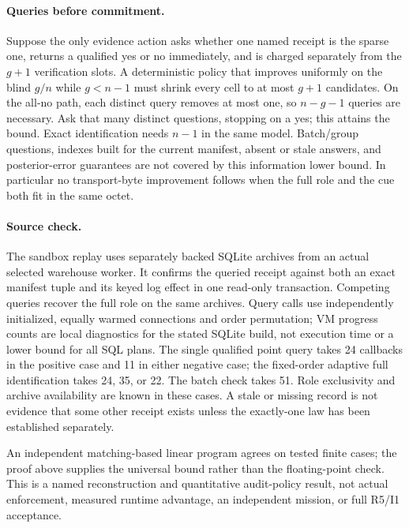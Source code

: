 \documentclass{article}
\begin{document}
\paragraph{Queries before commitment.}
Suppose the only evidence action asks whether one named receipt is
the sparse one, returns a qualified yes or no immediately, and is
charged separately from the $g+1$ verification slots. A deterministic
policy that improves uniformly on the blind $g/n$ while $g<n-1$
must shrink every cell to at most $g+1$ candidates. On the all-no
path, each distinct query removes at most one, so $n-g-1$ queries
are necessary. Ask that many distinct questions, stopping on a yes;
this attains the bound. Exact identification needs $n-1$ in the
same model. Batch/group questions, indexes built for the current
manifest, absent or stale answers, and posterior-error guarantees
are not covered by this information lower bound. In particular no
transport-byte improvement follows when the full role and the cue
both fit in the same octet.

\paragraph{Source check.}
The sandbox replay uses separately backed SQLite archives from an
actual selected warehouse worker. It confirms the queried receipt
against both an exact manifest tuple and its keyed log effect in
one read-only transaction. Competing queries recover the full role
on the same archives. Query calls use independently initialized,
equally warmed connections and order permutation; VM progress counts
are local diagnostics for the stated SQLite build, not execution time
or a lower bound for all SQL plans. The single qualified point query
takes 24 callbacks in the positive case and 11 in either negative
case; the fixed-order adaptive full identification takes 24, 35,
or 22. The batch check takes 51. Role exclusivity and archive
availability are known in these cases. A stale or missing record is
not evidence that some other receipt exists unless the exactly-one
law has been established separately.

An independent matching-based linear program agrees on tested finite
cases; the proof above supplies the universal bound rather than the
floating-point check. This is a named reconstruction and quantitative
audit-policy result, not actual enforcement, measured runtime
advantage, an independent mission, or full R5/I1 acceptance.
\end{document}
